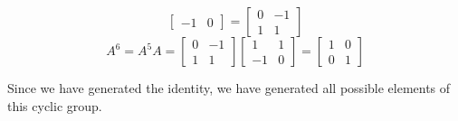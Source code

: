 \documentclass[12pt,letterpaper]{article}
\begin{document}
\begin{enumerate}
\[\begin{bmatrix}
          -1 & 0
        \end{bmatrix}
        =
        \begin{bmatrix}
          0  & -1 \\
          1  & 1
        \end{bmatrix}
      \]
      \[
        A^6 = A^5A =
        \begin{bmatrix}
          0  & -1 \\
          1  & 1
        \end{bmatrix}
        \begin{bmatrix}
          1  & 1  \\
          -1 & 0
        \end{bmatrix}
        =
        \begin{bmatrix}
          1  & 0  \\
          0  & 1
        \end{bmatrix}
      \]

      Since we have generated the identity,
      we have generated all possible elements of this cyclic group.
  \end{enumerate}
\end{document}
